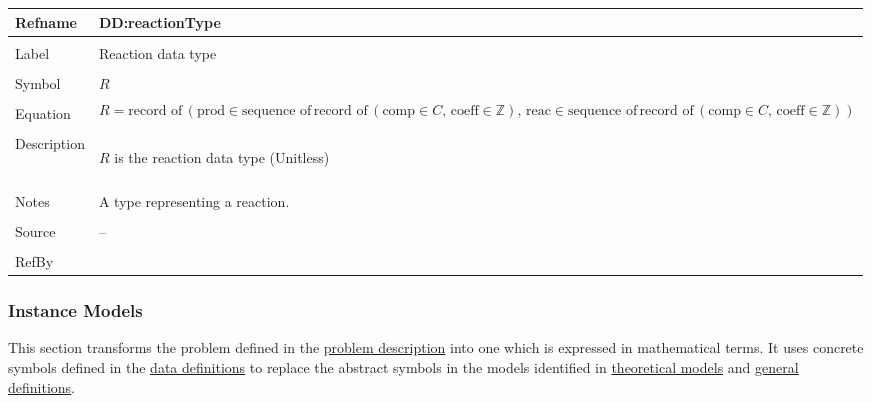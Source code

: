 \documentclass[12pt]{article}
\begin{document}
\begin{minipage}{\textwidth}
\begin{tabular}{>{\raggedright}p{}>{\raggedright\arraybackslash}p{}}
\toprule \textbf{Refname} & \textbf{DD:reactionType}
\label{DD:reactionType}
\\ \midrule \\
Label & Reaction data type
        
\\ \midrule \\
Symbol & $R$
         
\\ \midrule \\
Equation & \begin{displaymath}
           R=\text{record of}\,\left(\text{prod}\in{}\text{sequence of}\,\text{record of}\,\left(\text{comp}\in{}C,\,\text{coeff}\in{}\mathbb{Z}\right),\,\text{reac}\in{}\text{sequence of}\,\text{record of}\,\left(\text{comp}\in{}C,\,\text{coeff}\in{}\mathbb{Z}\right)\right)
           \end{displaymath}
\\ \midrule \\
Description & \begin{symbDescription}
              \item{$R$ is the reaction data type (Unitless)}
              \end{symbDescription}
\\ \midrule \\
Notes & A type representing a reaction.
        
\\ \midrule \\
Source & --
         
\\ \midrule \\
RefBy & 
\\ \bottomrule
\end{tabular}
\end{minipage}
\subsubsection{Instance Models}
\label{Sec:IMs}
This section transforms the problem defined in the \hyperref[Sec:ProbDesc]{problem description} into one which is expressed in mathematical terms. It uses concrete symbols defined in the \hyperref[Sec:DDs]{data definitions} to replace the abstract symbols in the models identified in \hyperref[Sec:TMs]{theoretical models} and \hyperref[Sec:GDs]{general definitions}.
\end{document}
